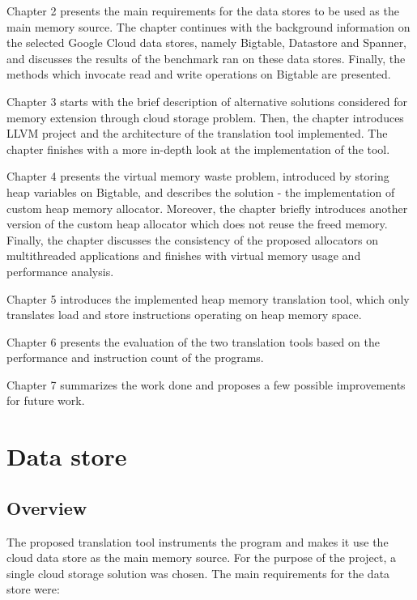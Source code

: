 \documentclass[bsc,frontabs,twoside,singlespacing,parskip,deptreport]{infthesis}     %
\begin{document}
Chapter 2 presents the main requirements for the data stores to be used as the main memory source. The chapter continues with the background information on the selected Google Cloud data stores, namely Bigtable, Datastore and Spanner, and discusses the results of the benchmark ran on these data stores. Finally, the methods which invocate read and write operations on Bigtable are presented.

Chapter 3 starts with the brief description of alternative solutions considered for memory extension through cloud storage problem. Then, the chapter introduces LLVM project and the architecture of the translation tool implemented. The chapter finishes with a more in-depth look at the implementation of the tool.

Chapter 4 presents the virtual memory waste problem, introduced by storing heap variables on Bigtable, and describes the solution - the implementation of custom heap memory allocator. Moreover, the chapter briefly introduces another version of the custom heap allocator which does not reuse the freed memory. Finally, the chapter discusses the consistency of the proposed allocators on multithreaded applications and finishes with virtual memory usage and performance analysis.

Chapter 5 introduces the implemented heap memory translation tool, which only translates load and store instructions operating on heap memory space.

Chapter 6 presents the evaluation of the two translation tools based on the performance and instruction count of the programs.

Chapter 7 summarizes the work done and proposes a few possible improvements for future work.

\chapter{Data store}

\section{Overview}

The proposed translation tool instruments the program and makes it use the cloud data store as the main memory source. For the purpose of the project, a single cloud storage solution was chosen.
The main requirements for the data store were:
\end{document}
